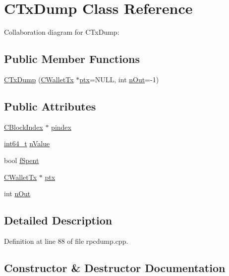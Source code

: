 \hypertarget{class_c_tx_dump}{}\section{C\+Tx\+Dump Class Reference}
\label{class_c_tx_dump}


Collaboration diagram for C\+Tx\+Dump\+:
\subsection*{Public Member Functions}
\begin{DoxyCompactItemize}
\item 
\hyperlink{class_c_tx_dump_a24c253b4afd04471ca984a5cda09c4b6}{C\+Tx\+Dump} (\hyperlink{class_c_wallet_tx}{C\+Wallet\+Tx} $\ast$\hyperlink{class_c_tx_dump_a35bc70e8a048c6a5c7d7d75007d23d24}{ptx}=N\+U\+L\+L, int \hyperlink{class_c_tx_dump_a4b59015f367c546b94f2710c8410f3df}{n\+Out}=-\/1)
\end{DoxyCompactItemize}
\subsection*{Public Attributes}
\begin{DoxyCompactItemize}
\item 
\hyperlink{class_c_block_index}{C\+Block\+Index} $\ast$ \hyperlink{class_c_tx_dump_a98da78bae1b040ff7e8f33cd7a91ccd0}{pindex}
\item 
\hyperlink{stdint_8h_adec1df1b8b51cb32b77e5b86fff46471}{int64\+\_\+t} \hyperlink{class_c_tx_dump_afca3ced942672136928b8f2cefc77ee7}{n\+Value}
\item 
bool \hyperlink{class_c_tx_dump_ab9414670ba3167741093b69bf8ff3d3c}{f\+Spent}
\item 
\hyperlink{class_c_wallet_tx}{C\+Wallet\+Tx} $\ast$ \hyperlink{class_c_tx_dump_a35bc70e8a048c6a5c7d7d75007d23d24}{ptx}
\item 
int \hyperlink{class_c_tx_dump_a4b59015f367c546b94f2710c8410f3df}{n\+Out}
\end{DoxyCompactItemize}


\subsection{Detailed Description}


Definition at line 88 of file rpcdump.\+cpp.



\subsection{Constructor \& Destructor Documentation}
\hypertarget{class_c_tx_dump_a24c253b4afd04471ca984a5cda09c4b6}{}
